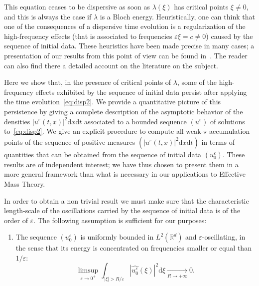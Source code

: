 \documentclass[AHL,Unicode,longabstracts]{cedram}
\newcommand*\R{{\mathbb R}}
\newcommand*\eps{\varepsilon}
\numberwithin{equation}{section}
\def\Tend#1#2{\mathop{\longrightarrow}\limits_{#1\rightarrow#2}}
\newcommand*{\Henumi}{\renewcommand*{\theenumi}{{H\arabic{enumi}}}}
\newcommand*{\dd}{\mathrm{d}}
\newcommand*{\dt}{\dd t}
\newcommand*{\dx}{\dd x}
\newcommand*{\dxi}{\dd \xi}
\begin{document}


This equation ceases to be dispersive as soon as $\lambda(\xi)$ has critical points $\xi \neq 0$, and this is always the case if $\lambda$ is a Bloch energy. Heuristically, one can think that one of the consequences of a dispersive time evolution is a regularization of the high-frequency effects (that is associated to frequencies $\eps\xi=c\neq 0$) caused by the sequence of initial data. These heuristics have been made precise in many cases; a presentation of our results from this point of view can be found in~\cite{CFMProc}. The reader can also find there a detailed account on the literature on the subject.


Here we show that, in the presence of critical points of $\lambda$, some of the high-frequency effects exhibited by the sequence of initial data persist after applying the time evolution~\eqref{eq:disp2}. We provide a quantitative picture of this persistence by giving a complete description of the asymptotic behavior of the densities $|u^\eps(t,x)|^2\dx\dt$ associated to a bounded sequence $(u^\eps)$ of solutions to~\eqref{eq:disp2}. We give an explicit procedure to compute all weak-$\star$ accumulation points of the sequence of positive measures $(|u^\eps(t,x)|^2\dx\dt)$ in terms of quantities that can be obtained from the sequence of initial data $(u_{0}^{\eps})$. These results are of independent interest; we have thus chosen to present them in a more general framework than what is necessary in our applications to Effective Mass Theory.


In order to obtain a non trivial result we must make sure that the characteristic length-scale of the oscillations carried by the sequence of initial data is of the order of $\eps$. The following assumption is sufficient for our purposes:
\begin{enumerate}\Henumi
\setcounter{enumi}{-1}\item\label{list2H0} The sequence $(u^\eps_0)$ is uniformly bounded in $L^2(\R^d)$ and $\eps$-oscillating, in the sense that its energy is concentrated on frequencies smaller or equal than $1/\eps$:
\begin{equation}\label{def:eps-osc}
\limsup_{\eps\rightarrow 0^+}\int_{|\xi|>R/\eps} \left| \widehat{u^\eps_0} (\xi)\right|^2 \dxi \Tend{R}{+\infty} 0.
\end{equation}
\end{enumerate}
\end{document}

